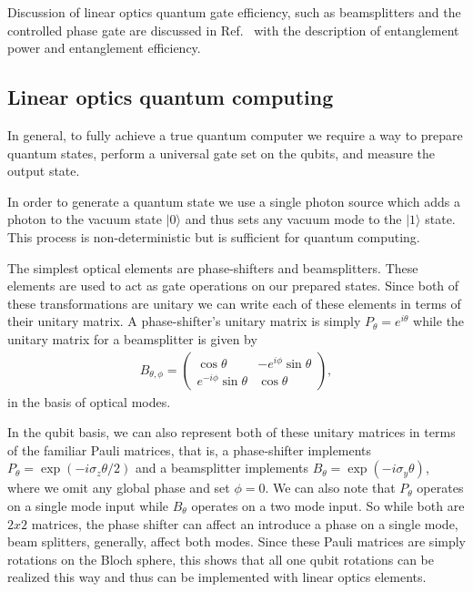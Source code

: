 \documentclass[aps,pra,twocolumn,amsmath,amssymb,nofootinbib,superscriptaddress]{revtex4}
\newcommand{\ket}[1]{|#1\rangle}
\begin{document}
Discussion of linear optics quantum gate efficiency, such as beamsplitters and the controlled phase gate are discussed in Ref.~\cite{lemr} with the description of entanglement power and entanglement efficiency.

\subsection{Linear optics quantum computing}

In general, to fully achieve a true quantum computer we require a way to prepare quantum states, perform a universal gate set on the qubits, and measure the output state.

In order to generate a quantum state we use a single photon source which adds a photon to the vacuum state $\ket{0}$ and thus sets any vacuum mode to the $\ket{1}$ state. This process is non-deterministic but is sufficient for quantum computing.

The simplest optical elements are phase-shifters and beamsplitters. These elements are used to act as gate operations on our prepared states. Since both of these transformations are unitary we can write each of these elements in terms of their unitary matrix. A phase-shifter's unitary matrix is simply $P_\theta = e^{i \theta}$ while the unitary matrix for a beamsplitter is given by
\begin{eqnarray}
B_{\theta,\phi}=
\left(
\begin{array}{cc}
\cos{\theta}& -e^{i \phi} \sin{\theta} \\
e^{-i \phi} \sin{\theta}& \cos{\theta} 
\end{array}
\right),
\end{eqnarray}
in the basis of optical modes.

In the qubit basis, we can also represent both of these unitary matrices in terms of the familiar Pauli matrices, that is, a phase-shifter implements $P_\theta = \exp{(-i \sigma_z \theta/2)}$ and a beamsplitter implements $B_\theta = \exp{(-i \sigma_y \theta)}$, where we omit any global phase and set $\phi=0$. We can also note that $P_\theta$ operates on a single mode input while $B_\theta$ operates on a two mode input. So while both are $2x2$ matrices, the phase shifter can affect an introduce a phase on a single mode, beam splitters, generally, affect both modes. Since these Pauli matrices are simply rotations on the Bloch sphere, this shows that all one qubit rotations can be realized this way and thus can be implemented with linear optics elements.
\end{document}
